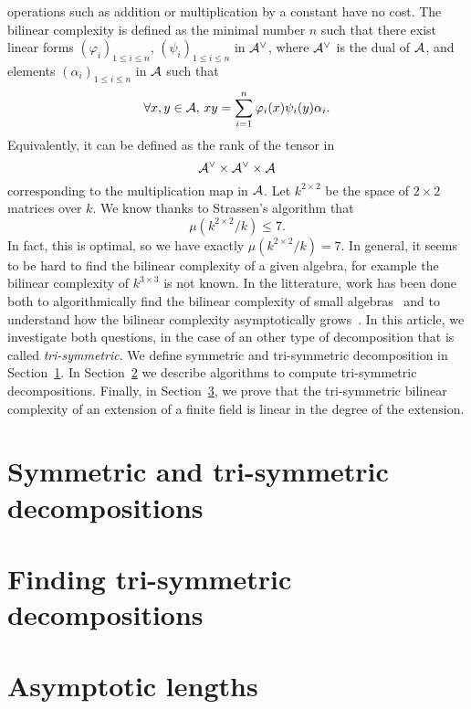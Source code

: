 \documentclass[a4paper,11pt]{article}
\begin{document}
operations such as addition or multiplication by a constant have no cost. The
bilinear complexity is defined as the minimal number $n$ such that there exist
linear forms $(\varphi_i)_{1\leq i \leq n}$, $(\psi_i)_{1\leq i \leq n}$ in
$\mathcal{A}^\vee$, where $\mathcal{A}^\vee$ is the dual of $\mathcal{A}$, and
elements $(\alpha_i)_{1\leq i \leq n}$ in $\mathcal{A}$ such that
\[
  \forall x, y\in\mathcal{A},\,xy = \sum_{i=1}^{n}\varphi_i(x)\psi_i(y)\alpha_i.
\]
Equivalently, it can be defined as the rank of the tensor in
\[
  \mathcal{A}^\vee \times \mathcal{A}^\vee\times \mathcal{A}
\]
corresponding to the multiplication map in $\mathcal{A}$. Let $k^{2\times2}$ be the space
of $2\times2$ matrices over $k$. We know thanks to Strassen's algorithm that 
\[
  \mu(k^{2\times 2}/k) \leq 7.
\]
In fact, this is optimal, so we have exactly $\mu(k^{2\times2}/k)=7$. In
general, it seems to be hard to find the bilinear complexity of a given algebra,
for example the bilinear complexity of $k^{3\times3}$ is not known.
In the litterature, work has been done both to algorithmically find the bilinear complexity of
small algebras~\cite{BDEZ12, Covanov18} and to understand how the bilinear
complexity asymptotically grows~\cite{CC88, BCPRRR}. In this article, we
investigate both questions, in the case of an other type of decomposition that
is called \emph{tri-symmetric}. We define symmetric and tri-symmetric
decomposition in Section~\ref{sec:symtrisym}. In Section~\ref{sec:algos} we
describe algorithms to compute tri-symmetric decompositions. Finally, in
Section~\ref{sec:asymptotic}, we prove that the tri-symmetric bilinear
complexity of an extension of a finite field is linear in the degree of the
extension.

\section{Symmetric and tri-symmetric decompositions}
\label{sec:symtrisym}

\section{Finding tri-symmetric decompositions}
\label{sec:algos}

\section{Asymptotic lengths}
\label{sec:asymptotic}
\end{document}
